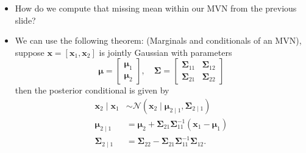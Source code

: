 \documentclass[9pt,hyperref={pdfpagelabels=false},xcolor=table]{beamer}
\begin{document}
\begin{frame}
    \begin{itemize}
        \item How do we compute that missing mean within our MVN from the previous slide?
              \pause
        \item We can use the following theorem: (Marginals and conditionals of an MVN), suppose $\bm{x} = [ \bm{x}_1, \bm{x}_2 ]$ is jointly Gaussian with parameters
              \[
                  \bm{\mu} =
                  \begin{bmatrix}
                      \bm{\mu}_1 \\
                      \bm{\mu}_2
                  \end{bmatrix}, \quad
                  \bm{\Sigma} =
                  \begin{bmatrix}
                      \bm{\Sigma}_{11} & \bm{\Sigma}_{12} \\
                      \bm{\Sigma}_{21} & \bm{\Sigma}_{22}
                  \end{bmatrix}
              \]
              then the posterior conditional is given by
              \begin{align*}
                  \bm{x}_2 \mid \bm{x}_1 & \sim \mathcal{N} \left( \bm{x}_2 \mid \bm{\mu}_{2 \mid 1}, \bm{\Sigma}_{2 \mid 1} \right)  \\
                  \bm{\mu}_{2 \mid 1}    & = \bm{\mu}_2 + \bm{\Sigma}_{21} \bm{\Sigma}_{11}^{-1} \left( \bm{x}_1 - \bm{\mu}_1 \right) \\
                  \bm{\Sigma}_{2 \mid 1} & = \bm{\Sigma}_{22} - \bm{\Sigma}_{21} \bm{\Sigma}_{11}^{-1} \bm{\Sigma}_{12}.
              \end{align*}
    \end{itemize}
\end{frame}
\end{document}
